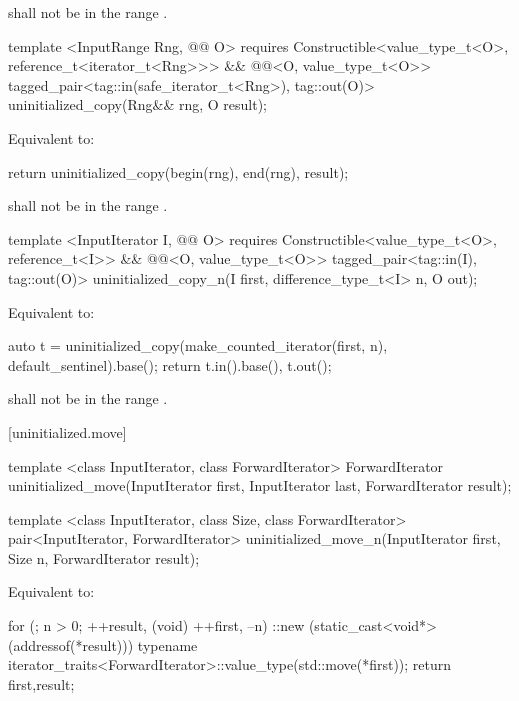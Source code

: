 {\color{addclr}
\requires {} shall not be in the range .

\begin{codeblock}
template <InputRange Rng, @@ O>
requires
  Constructible<value_type_t<O>, reference_t<iterator_t<Rng>>> &&
  @@<O, value_type_t<O>>
tagged_pair<tag::in(safe_iterator_t<Rng>), tag::out(O)> uninitialized_copy(Rng&& rng, O result);
\end{codeblock}

\pnum
\effects Equivalent to:
\begin{codeblock}
    return uninitialized_copy(begin(rng), end(rng), result);
\end{codeblock}

\pnum
\requires {} shall not be in the range .

\begin{codeblock}
template <InputIterator I, @@ O>
requires
  Constructible<value_type_t<O>, reference_t<I>> &&
  @@<O, value_type_t<O>>
tagged_pair<tag::in(I), tag::out(O)> uninitialized_copy_n(I first, difference_type_t<I> n, O out);
\end{codeblock}

\pnum
\effects Equivalent to:
\begin{codeblock}
    auto t = uninitialized_copy(make_counted_iterator(first, n), default_sentinel{}).base();
    return {t.in().base(), t.out()};
\end{codeblock}

\requires {} shall not be in the range .
} %

[uninitialized.move]{}
{\color{remclr}
\begin{codeblock}
template <class InputIterator, class ForwardIterator>
  ForwardIterator uninitialized_move(InputIterator first, InputIterator last,
                                     ForwardIterator result);
\end{codeblock}

\begin{codeblock}
template <class InputIterator, class Size, class ForwardIterator>
  pair<InputIterator, ForwardIterator>
    uninitialized_move_n(InputIterator first, Size n, ForwardIterator result);
\end{codeblock}

\setcounter{Paras}{2}
\pnum
\effects Equivalent to:
\begin{codeblock}
        for (; n > 0; ++result, (void) ++first, --n)
          ::new (static_cast<void*>(addressof(*result)))
            typename iterator_traits<ForwardIterator>::value_type(std::move(*first));
        return {first,result};
\end{codeblock}
} %

